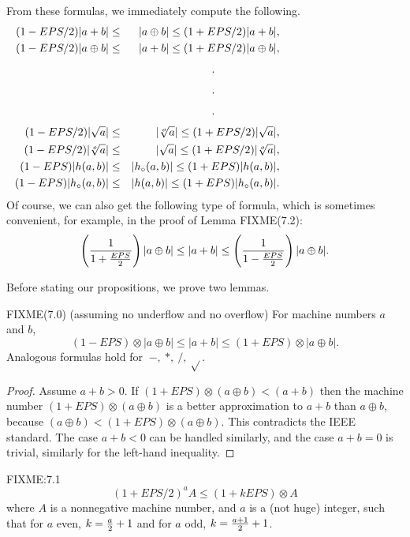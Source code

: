 \begin{definition}
 
From these formulas, we immediately compute the following.
\begin{eqnarray*}
(1 - EPS/2) |a + b| &\leq& |a \oplus b| 
\leq (1 + EPS/2) |a+b|, \\ 
  (1 - EPS/2) |a \oplus b|& \leq& |a + b| 
\leq (1 + EPS/2) |a \oplus b|,\\
\noalign{\vskip4pt}
\noalign{\hfil .\hfil }  \noalign{\vskip4pt}
\noalign{\hfil .\hfil } \noalign{\vskip4pt}
\noalign{\hfil .\hfil } \noalign{\vskip4pt}
(1 - EPS/2) |\sqrt a| &\leq&  |\root o \of a| 
\leq (1 + EPS/2) |\sqrt a|, \\ (1 - EPS/2) |\root o \of a|&\leq&  |\sqrt a| 
\leq (1 + EPS/2) |\root o \of a|, \\  (1 - EPS) |h(a,b)| &\leq&  |h_\circ (a,b)| 
\leq (1 + EPS) |h(a,b)|, \\  (1 - EPS) |h_\circ (a,b)| &\leq& |h(a,b)| 
\leq (1 + EPS) |h_\circ (a,b)|.
\end{eqnarray*}
Of course, we can also get the following type of formula, which is sometimes convenient,
 for example, in the proof of Lemma FIXME(7.2):
$$\left({1 \over {1 + {EPS \over 2}}}\right) |a \oplus b| \leq |a + b| 
\leq \left({1 \over {1 - {EPS \over 2}}}\right) |a \oplus b|.$$

Before stating our propositions, we prove two lemmas.

\begin{lemma}{FIXME(7.0) {\textrm (assuming no underflow and no overflow)}} 
For machine numbers $a$ and $b${\textrm ,}
$$(1 - EPS) \otimes |a \oplus b| \le |a + b| \le (1 + EPS) \otimes |a \oplus b|.$$
 Analogous formulas hold for $\ -,\ *,\ /,\ \sqrt{}$.
\end{lemma}

\begin{proof}{}
Assume $a+b > 0$.  
If $(1+EPS) \otimes (a \oplus b) < (a+b)$ then the machine number 
$(1+EPS) \otimes (a \oplus b)$ is a better approximation to $a+b$ than $a \oplus b$, because $(a \oplus b) 
< (1+EPS) \otimes (a \oplus b)$.  This contradicts the IEEE standard.  The case $a+b < 0$ can be handled similarly, and the
case $a+b = 0$ is trivial, similarly for the left-hand inequality.
\end{proof}

\begin{lemma}{FIXME:7.1} $$(1 + EPS/2)^a A \le (1 + k EPS) \otimes A$$ 
 where $A$ is a nonnegative machine number{\textrm ,} and $a$ is a {\textrm (}\/not huge\/{\textrm )} integer{\textrm ,} such that
for $a$ even{\textrm ,} $k = {a \over 2} + 1$ and  for $a$ odd, $k = {a+1 \over 2} + 1$. 
\end{lemma}


\end{definition}
